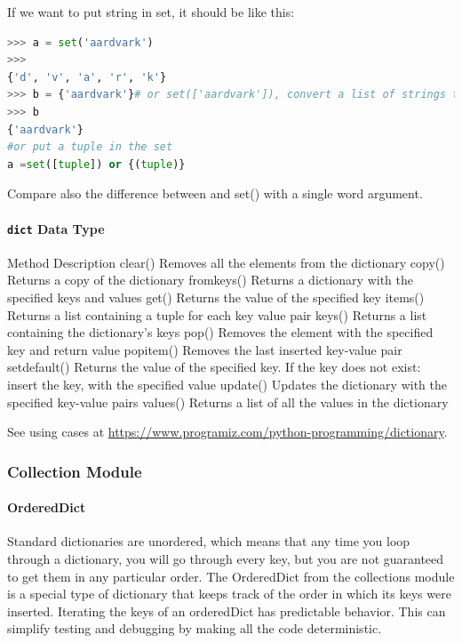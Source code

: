 \documentclass[../main.tex]{subfiles}
\begin{document}
If we want to put string in set, it should be like this:
\begin{lstlisting}[language = Python]
>>> a = set('aardvark') 
>>> 
{'d', 'v', 'a', 'r', 'k'} 
>>> b = {'aardvark'}# or set(['aardvark']), convert a list of strings to set
>>> b
{'aardvark'}
#or put a tuple in the set
a =set([tuple]) or {(tuple)}
\end{lstlisting}
Compare also the difference between {} and set() with a single word argument.

\paragraph{\texttt{dict} Data Type} 
Method 	Description
clear()	Removes all the elements from the dictionary
copy()	Returns a copy of the dictionary
fromkeys()	Returns a dictionary with the specified keys and values
get()	Returns the value of the specified key
items()	Returns a list containing a tuple for each key value pair
keys()	Returns a list containing the dictionary's keys
pop()	Removes the element with the specified key and return value
popitem()	Removes the last inserted key-value pair
setdefault()	Returns the value of the specified key. If the key does not exist: insert the key, with the specified value
update()	Updates the dictionary with the specified key-value pairs
values()	Returns a list of all the values in the dictionary

See using cases at \url{https://www.programiz.com/python-programming/dictionary}.


\subsubsection{Collection Module}
\paragraph{OrderedDict} Standard dictionaries are unordered, which means that any time you loop through a dictionary, you will go through every key, but you are not guaranteed to get them in any particular order.
The OrderedDict from the collections module is a special type of dictionary that keeps track of the order in which its keys were inserted. Iterating the keys of an orderedDict has predictable behavior. This can simplify testing and debugging by making all the code deterministic.
\end{document}
